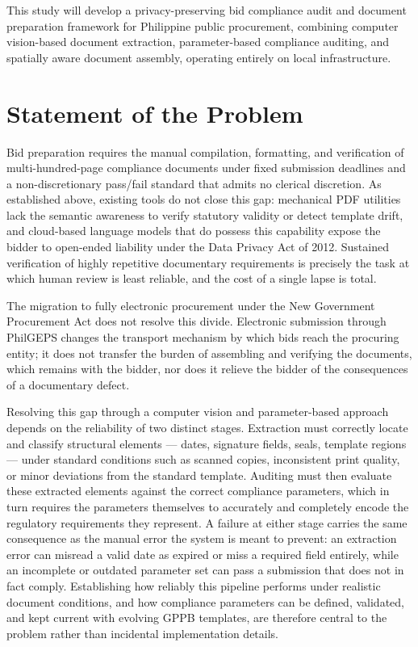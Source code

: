 This study will develop a privacy-preserving bid compliance audit and document preparation framework for Philippine public procurement, combining computer vision-based document extraction, parameter-based compliance auditing, and spatially aware document assembly, operating entirely on local infrastructure.

\section{Statement of the Problem}
\label{sec:statement_of_problem}
Bid preparation requires the manual compilation, formatting, and verification of multi-hundred-page compliance documents under fixed submission deadlines and a non-discretionary pass/fail standard that admits no clerical discretion.
As established above, existing tools do not close this gap: mechanical PDF utilities lack the semantic awareness to verify statutory validity or detect template drift, and cloud-based language models that do possess this capability expose the bidder to open-ended liability under the Data Privacy Act of 2012.
Sustained verification of highly repetitive documentary requirements is precisely the task at which human review is least reliable, and the cost of a single lapse is total.

The migration to fully electronic procurement under the New Government Procurement Act does not resolve this divide.
Electronic submission through PhilGEPS changes the transport mechanism by which bids reach the procuring entity; it does not transfer the burden of assembling and verifying the documents, which remains with the bidder, nor does it relieve the bidder of the consequences of a documentary defect.

Resolving this gap through a computer vision and parameter-based approach depends on the reliability of two distinct stages.
Extraction must correctly locate and classify structural elements — dates, signature fields, seals, template regions — under standard conditions such as scanned copies, inconsistent print quality, or minor deviations from the standard template.
Auditing must then evaluate these extracted elements against the correct compliance parameters, which in turn requires the parameters themselves to accurately and completely encode the regulatory requirements they represent.
A failure at either stage carries the same consequence as the manual error the system is meant to prevent: an extraction error can misread a valid date as expired or miss a required field entirely, while an incomplete or outdated parameter set can pass a submission that does not in fact comply.
Establishing how reliably this pipeline performs under realistic document conditions, and how compliance parameters can be defined, validated, and kept current with evolving GPPB templates, are therefore central to the problem rather than incidental implementation details.

